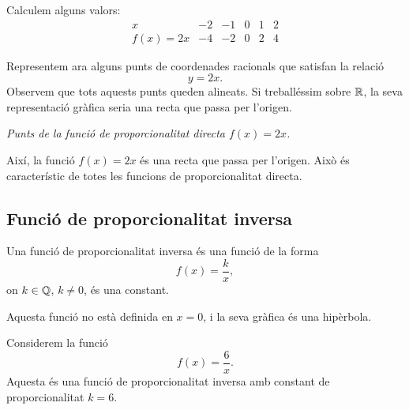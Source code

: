 \begin{solucio}
Calculem alguns valors:
\[
\begin{array}{c|ccccc}
x & -2 & -1 & 0 & 1 & 2 \\
\hline
f(x)=2x & -4 & -2 & 0 & 2 & 4
\end{array}
\]

Representem ara alguns punts de coordenades racionals que satisfan la relació
\[
	y=2x.
\]
Observem que tots aquests punts queden alineats. Si treballéssim sobre \(\mathbb{R}\), la seva representació gràfica seria una recta que passa per l'origen.

\begin{center}

\smallskip
\textit{Punts de la funció de proporcionalitat directa \(f(x)=2x\).}
\end{center}

Així, la funció \(f(x)=2x\) és una recta que passa per l'origen. Això és característic de totes les funcions de proporcionalitat directa.
\end{solucio}

\subsection{Funció de proporcionalitat inversa}

Una funció de proporcionalitat inversa és una funció de la forma
\[
	f(x)=\frac{k}{x},
\]
on \(k\in\mathbb{Q}\), \(k\neq0\), és una constant.

Aquesta funció no està definida en \(x=0\), i la seva gràfica és una hipèrbola.

\begin{exemple}
Considerem la funció
\[
	f(x)=\frac{6}{x}.
\]
Aquesta és una funció de proporcionalitat inversa amb constant de proporcionalitat \(k=6\).
\end{exemple}


